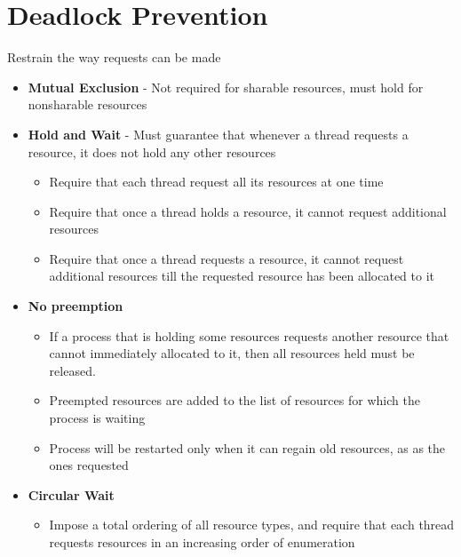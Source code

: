 \documentclass[oneside]{book}
\begin{document}
        \section{Deadlock Prevention}
            Restrain the way requests can be made
            \begin{itemize}
                \item \textbf{Mutual Exclusion} - Not required for sharable resources, must hold for nonsharable
                resources
                \item \textbf{Hold and Wait} - Must guarantee that whenever a thread requests a resource, it does
                not hold any other resources
                    \begin{itemize}
                        \item Require that each thread request all its resources at one time
                        \item Require that once a thread holds a resource, it cannot request additional resources
                        \item Require that once a thread requests a resource, it cannot request additional resources
                        till the requested resource has been allocated to it
                    \end{itemize}
                \item \textbf{No preemption}
                    \begin{itemize}
                        \item If a process that is holding some resources requests another resource that cannot immediately
                        allocated to it, then all resources held must be released.
                        \item Preempted resources are added to the list of resources for which the process is waiting
                        \item Process will be restarted only when it can regain old resources, as as the ones requested
                    \end{itemize}
                \item \textbf{Circular Wait}
                    \begin{itemize}
                        \item Impose a total ordering of all resource types, and require that each thread requests resources
                        in an increasing order of enumeration
                    \end{itemize}
            \end{itemize}
\end{document}
